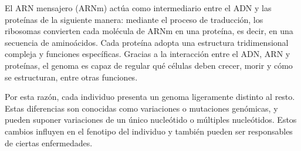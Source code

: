 \documentclass[11pt,spanish,listoffigures,listoftables]{tfgetsinf}
\begin{document}
El ARN mensajero (ARNm) actúa como intermediario entre el ADN y las proteínas de la siguiente manera: mediante el proceso de traducción, los ribosomas convierten cada molécula de ARNm en una proteína, es decir, en una secuencia de aminoácidos. Cada proteína adopta una estructura tridimensional compleja y funciones específicas. Gracias a la interacción entre el ADN, ARN y proteínas, el genoma es capaz de regular qué células deben crecer, morir y cómo se estructuran, entre otras funciones\cite{RIN}. 


Por esta razón, cada individuo presenta un genoma ligeramente distinto al resto. Estas diferencias son conocidas como variaciones o mutaciones genómicas, y pueden suponer variaciones de un único nucleótido o múltiples nucleótidos. Estos cambios influyen en el fenotipo del individuo y también pueden ser responsables de ciertas enfermedades. 
\end{document}
